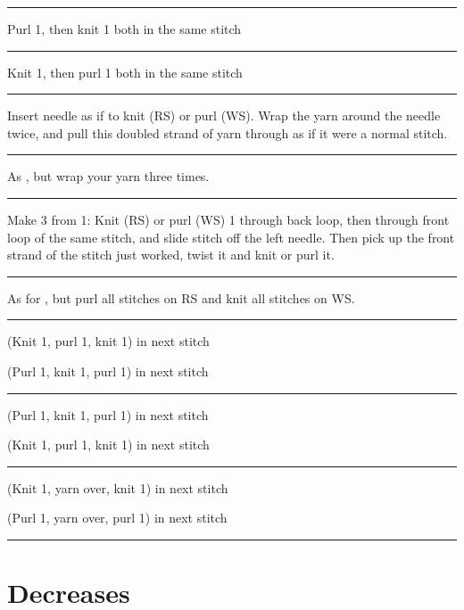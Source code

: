 \documentclass{amsart}
\newif \ifdesigner
\newlength{\symbolcolwidth}
\newlength{\singlecolwidth}
\newlength{\doublecolwidth}
\newcommand\keyrow[3]{\par\allowbreak\hrule\par\nopagebreak\noindent
	\vrule\hfill 
	\begin{minipage}{\symbolcolwidth}\centering#1\end{minipage}%
	\hfill\vrule\hfill
	\begin{minipage}{\singlecolwidth}
		\raisebox{1pt}{\strut}#2\raisebox{-1pt}{\strut}\end{minipage}%
	\hfill\vrule\hfill
	\begin{minipage}{\singlecolwidth}
		\raisebox{1pt}{\strut}#3\raisebox{-1pt}{\strut}\end{minipage}%
	\hfill\vrule
	\par\nointerlineskip}
\newcommand\dblkeyrow[2]{\par\allowbreak\hrule\par\nopagebreak\noindent
	\vrule\hfill
	\begin{minipage}{\symbolcolwidth}\centering#1\end{minipage}%
	\hfill\vrule\hfill
	\begin{minipage}{\doublecolwidth}
		\raisebox{1pt}{\strut}#2\raisebox{-1pt}{\strut}\end{minipage}%
	\hfill\vrule
	\par\nointerlineskip}
\begin{document}
\begin{fullpages}
\dblkeyrow{}{Purl 1, then knit 1 both in the same stitch}
\dblkeyrow{}{Knit 1, then purl 1 both in the same stitch}
\dblkeyrow{}{Insert needle as if to knit (RS) or purl (WS). Wrap the yarn around the needle twice, and pull this doubled strand of yarn through as if it were a normal stitch.}
\dblkeyrow{}{As , but wrap your yarn three times.}
\dblkeyrow{}{Make 3 from 1: Knit (RS) or purl (WS) 1 through back loop, then through front loop of the same stitch, and slide stitch off the left needle. Then pick up the front strand of the stitch just worked, twist it and knit or purl it.}
\dblkeyrow{}{As for , but purl all stitches on RS and knit all stitches on WS.}
\keyrow{}{(Knit 1, purl 1, knit 1) in next stitch}{(Purl 1, knit 1, purl 1) in next stitch}
\keyrow{\textknit{\&}}{(Purl 1, knit 1, purl 1) in next stitch}{(Knit 1, purl 1, knit 1) in next stitch}
\keyrow{}{(Knit 1, yarn over, knit 1) in next stitch}{(Purl 1, yarn over, purl 1) in next stitch}
\hrule

\clearpage

\section{Decreases}

\ifdesigner
Purl decreases produce strong diagonal lines on the wrong side. You
may wish to use \textknit{;} for p2tog and \textknit{:} for SSP tbl if
you wish to clearly indicate which way these diagonal lines slant.

You may also think that \textknit{4} and \textknit{5} look better in your pattern than \textknit{<} and \textknit{>}; their definitions may be interchanged.

\nopagebreak

\medskip
\fi


\end{fullpages}
\end{document}

